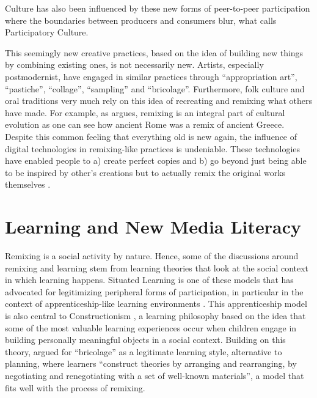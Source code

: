 Culture has also been influenced by these new forms of peer-to-peer participation where the boundaries between producers and consumers blur, what \citet{jenkins_convergence_2006} calls Participatory Culture.

This seemingly new creative practices, based on the idea of building new things by combining existing ones, is not necessarily new. 
Artists, especially postmodernist, have engaged in similar practices through ``appropriation art'', ``pastiche'', ``collage'', ``sampling'' and ``bricolage''. 
Furthermore, folk culture and oral traditions very much rely on this idea of recreating and remixing what others have made. %
For example, as \citet{manovich_remix_2005} argues, remixing is an integral part of cultural evolution as one can see how ancient Rome was a remix of ancient Greece.
Despite this common feeling that everything old is new again, the influence of digital technologies in remixing-like practices is undeniable. 
These technologies have enabled people to a) create perfect copies and b) go beyond just being able to be inspired by other's creations but to actually remix the original works themselves \citep{sinnreich_ethics_2009}.

\section{Learning and New Media Literacy}

Remixing is a social activity by nature. Hence, some of the discussions around remixing and learning stem from learning theories that look at the social context in which learning happens.
Situated Learning is one of these models that has advocated for legitimizing peripheral forms of participation, in particular in the context of apprenticeship-like learning environments \citep{lave_situated_1991}. 
This apprenticeship model is also central to Constructionism \citep{papert_mindstorms_1980}, a learning philosophy based on the idea that some of the most valuable learning experiences occur when children engage in building personally meaningful objects in a social context. 
Building on this theory, \citet{turkle_epistemological_1990} argued for ``bricolage'' as a legitimate learning style, alternative to planning, where learners ``construct theories by arranging and rearranging, by negotiating and renegotiating with a set of well-known materials'', a model that fits well with the process of remixing.


